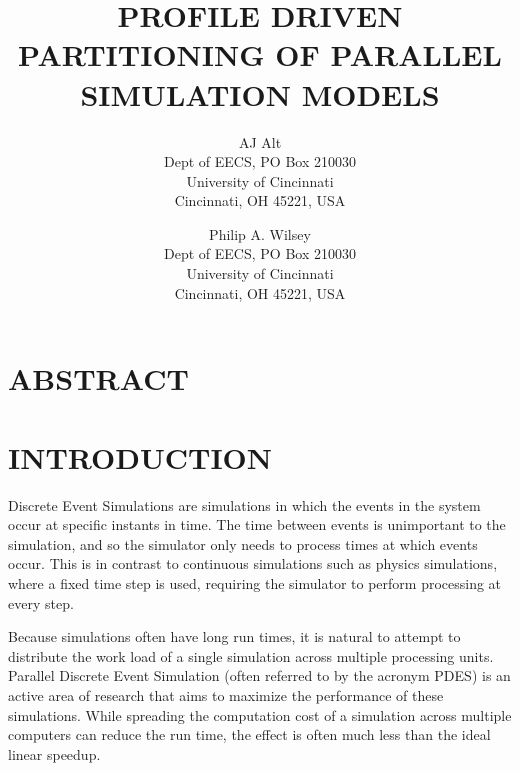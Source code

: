 \documentclass{wscpaperproc}
\begin{document}
%
%

\title{PROFILE DRIVEN PARTITIONING OF PARALLEL SIMULATION MODELS}

\author{AJ Alt\\ [12pt]
Dept of EECS, PO Box 210030\\
University of Cincinnati\\
Cincinnati, OH 45221, USA\\
\and
Philip A. Wilsey \\[12pt]
Dept of EECS, PO Box 210030\\
University of Cincinnati\\
Cincinnati, OH 45221, USA
}

\maketitle

\section*{ABSTRACT}



\section{INTRODUCTION}\label{sec:intro}

Discrete Event Simulations are simulations in which the events in the system occur at specific instants in time. The time between events is unimportant to the simulation, and so the simulator only needs to process times at which events occur. This is in contrast to continuous simulations such as physics simulations, where a fixed time step is used, requiring the simulator to perform processing at every step. 

Because simulations often have long run times, it is natural to attempt to distribute the work load of a single simulation across multiple processing units. Parallel Discrete Event Simulation (often referred to by the acronym PDES) is an active area of research that aims to maximize the performance of these simulations. While spreading the computation cost of a simulation across multiple computers can reduce the run time, the effect is often much less than the ideal linear speedup. 
\end{document}
